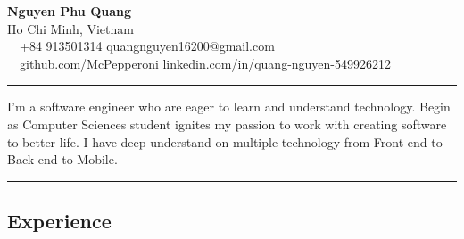 \documentclass[11pt,letterpaper]{article}
\begin{document}
\begin{center}
    {\LARGE \textbf{Nguyen Phu Quang}}\\
    Ho Chi Minh, Vietnam
    \vspace{0.1cm}
    \\
    \raisebox{-0.2\height} {\Large \faPhoneSquare} \ \  +84 913501314 \hfill quangnguyen16200@gmail.com \ \ \raisebox{-0.2\height}{\Large \faEnvelopeSquare}
    \\
    \raisebox{-0.2\height}{\Large \faGithubSquare} \ \ github.com/McPepperoni \hfill linkedin.com/in/quang-nguyen-549926212 \raisebox{-0.2\height}{\Large \faLinkedinSquare}
\end{center}

\hrule
\vspace{.5cm}
\justifying
I'm a software engineer who are eager to learn and understand technology. Begin as Computer Sciences student ignites my passion to work with creating software to better life. I have deep understand on multiple technology
from Front-end to Back-end to Mobile.
\vspace{.5cm}

\hrule
\vspace{-1em}
\subsection*{\Large Experience}
\end{document}
